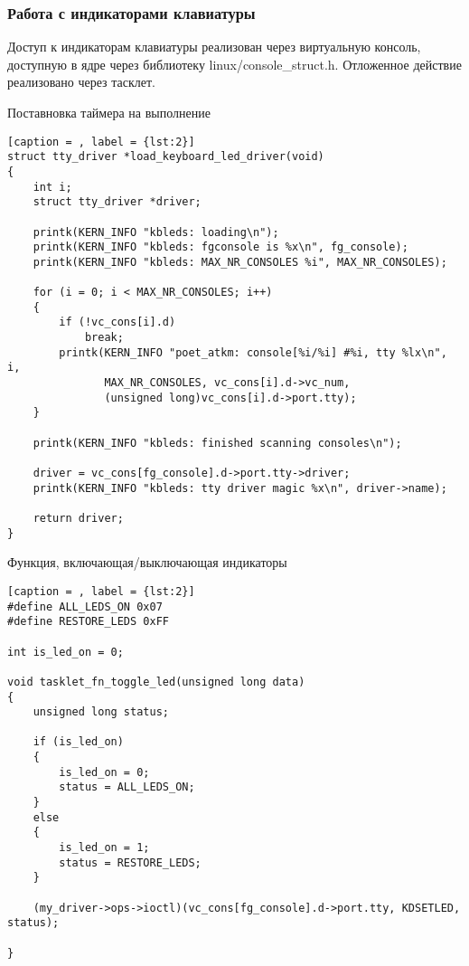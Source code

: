 \subsubsection{Работа с индикаторами клавиатуры}
Доступ к индикаторам клавиатуры реализован через виртуальную консоль, доступную в ядре через библиотеку linux/console\_struct.h. Отложенное действие реализовано через тасклет.

Поставновка таймера на выполнение
\begin{lstlisting}[caption = , label = {lst:2}]
struct tty_driver *load_keyboard_led_driver(void)
{
    int i;
    struct tty_driver *driver;

    printk(KERN_INFO "kbleds: loading\n");
    printk(KERN_INFO "kbleds: fgconsole is %x\n", fg_console);
    printk(KERN_INFO "kbleds: MAX_NR_CONSOLES %i", MAX_NR_CONSOLES);
    
    for (i = 0; i < MAX_NR_CONSOLES; i++)
    {
        if (!vc_cons[i].d)
            break;
        printk(KERN_INFO "poet_atkm: console[%i/%i] #%i, tty %lx\n", i,
               MAX_NR_CONSOLES, vc_cons[i].d->vc_num,
               (unsigned long)vc_cons[i].d->port.tty);
    }

    printk(KERN_INFO "kbleds: finished scanning consoles\n");

    driver = vc_cons[fg_console].d->port.tty->driver;
    printk(KERN_INFO "kbleds: tty driver magic %x\n", driver->name);

    return driver;
}
\end{lstlisting}

Функция, включающая/выключающая индикаторы
\begin{lstlisting}[caption = , label = {lst:2}]
#define ALL_LEDS_ON 0x07
#define RESTORE_LEDS 0xFF

int is_led_on = 0;

void tasklet_fn_toggle_led(unsigned long data)
{
    unsigned long status;

    if (is_led_on)
    {
        is_led_on = 0;
        status = ALL_LEDS_ON;
    }
    else
    {
        is_led_on = 1;
        status = RESTORE_LEDS;
    }

    (my_driver->ops->ioctl)(vc_cons[fg_console].d->port.tty, KDSETLED, status);

}
\end{lstlisting}

